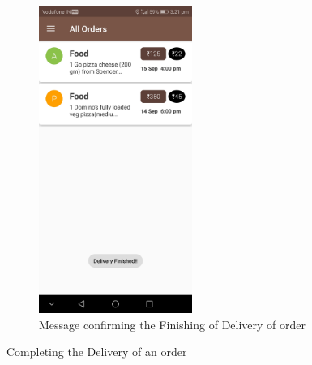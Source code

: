 \documentclass{report}
\begin{document}
\begin{figure}[h!]
\begin{subfigure}[h!]{.3\textwidth}
\includegraphics[width=5cm]{delivery_finished.jpg}
\caption{\centering Message confirming the Finishing of Delivery of order}
\end{subfigure}
\caption{Completing the Delivery of an order} 
\label{fig:NASA_Logo}
\end{figure}

\end{document}
